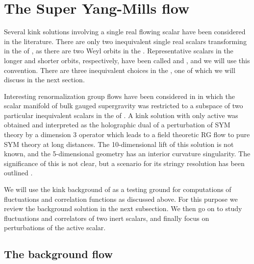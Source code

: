 \documentclass[a4paper,12pt]{article}
\def\mt{\tilde{m}}
\begin{document}
\section{The \coordHE{} Super Yang-Mills flow}
\label{sym}


Several kink solutions involving a single real flowing scalar have
been considered in the literature.  There are only two inequivalent
single real scalars transforming in the \coordHE{} of \coordHE{}, as there are two Weyl orbits in the \coordHE{}.  Representative scalars in the longer and shorter orbits,
respectively, have been called \myHighlight{$\sigma$}\coordHE{} and \coordHE{}, and we will use this
convention.  There are three inequivalent choices in the \coordHE{}, one of
which we will discuss in the next section.

Interesting renormalization group flows have been considered in
\cite{gppz} in which the scalar manifold of bulk \coordHE{} gauged
supergravity was restricted to a subspace of two particular
inequivalent scalars in the \coordHE{} of
\coordHE{}.  A kink solution with only \coordHE{} active was obtained and
interpreted as the holographic dual of a perturbation of \coordHE{}
SYM theory by a dimension 3 operator which leads to a field theoretic
RG flow to pure \coordHE{} SYM theory at long distances. The
10-dimensional lift of this solution is not known, and the
5-dimensional geometry has an interior curvature singularity. The
significance of this is not clear, but a scenario for its stringy
resolution has been outlined \cite{sp}.

We will use the kink background of \cite{gppz} as a testing ground for
computations of fluctuations and correlation functions as discussed
above.  For this purpose we review the background solution in the next
subsection. We then go on to study fluctuations and correlators of two
inert scalars, and finally focus on perturbations \myHighlight{$\mt(r,p)$}\coordHE{} of the
active scalar.


\subsection{The background flow}
\end{document}
